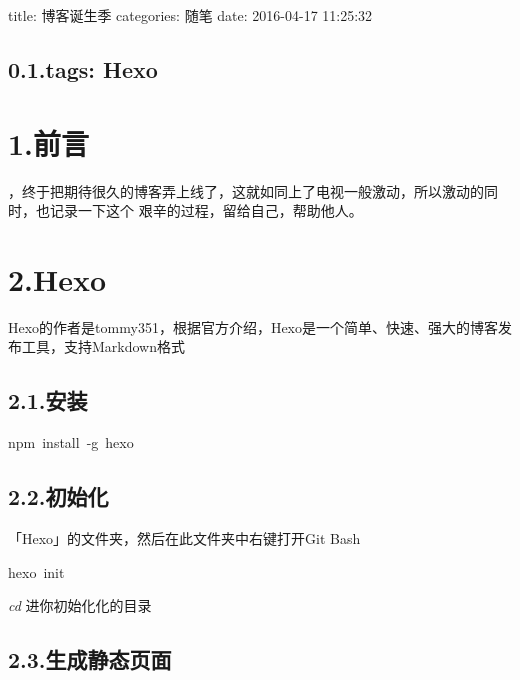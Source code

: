 \documentclass{article}
\begin{document}
\mdhr{}%

\noindent title: 博客诞生季
categories: 随笔
date: 2016-04-17 11:25:32%

\subsection{0.1.\hspace*{0.5em}tags: Hexo}\label{sec-tags--hexo}%

\section{1.\hspace*{0.5em}前言}\label{section}%

，终于把期待很久的博客弄上线了，这就如同上了电视一般激动，所以激动的同时，也记录一下这个
艰辛的过程，留给自己，帮助他人。%

\section{2.\hspace*{0.5em}Hexo}\label{sec-hexo}%

\noindent Hexo的作者是tommy351，根据官方介绍，Hexo是一个简单、快速、强大的博客发布工具，支持Markdown格式%

\subsection{2.1.\hspace*{0.5em}安装}\label{section}%

\begin{mdpre}%
\noindent npm~install~-g~hexo%
\end{mdpre}
\subsection{2.2.\hspace*{0.5em}初始化}\label{section}%

「Hexo」的文件夹，然后在此文件夹中右键打开Git Bash%
\begin{mdpre}%
\noindent hexo~init%
\end{mdpre} \emph{cd} 进你初始化化的目录

\subsection{2.3.\hspace*{0.5em}生成静态页面}\label{section}%
\end{document}
